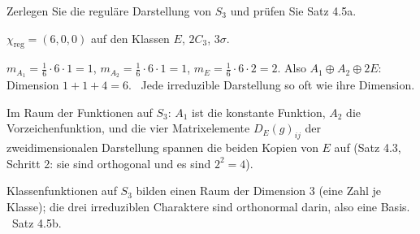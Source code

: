 \begin{aufgabe}
Zerlegen Sie die reguläre Darstellung von $S_3$ und prüfen Sie Satz 4.5a.

\loesung
{}
$\chi_{\mathrm{reg}} = (6, 0, 0)$ auf den Klassen $E$, $2C_3$, $3\sigma$.

$m_{A_1} = \frac16\cdot6\cdot1 = 1$, $m_{A_2} = \frac16\cdot6\cdot1 = 1$, $m_E = \frac16\cdot6\cdot2 = 2$. Also $A_1\oplus A_2\oplus2E$: Dimension $1 + 1 + 4 = 6$. \checkmark\ Jede irreduzible Darstellung so oft wie ihre Dimension. \checkmark

Im Raum der Funktionen auf $S_3$: $A_1$ ist die konstante Funktion, $A_2$ die Vorzeichenfunktion, und die vier Matrixelemente $D_E(g)_{ij}$ der zweidimensionalen Darstellung spannen die beiden Kopien von $E$ auf (Satz 4.3, Schritt 2: sie sind orthogonal und es sind $2^{2} = 4$).

Klassenfunktionen auf $S_3$ bilden einen Raum der Dimension $3$ (eine Zahl je Klasse); die drei irreduziblen Charaktere sind orthonormal darin, also eine Basis. \checkmark\ Satz 4.5b.

\begin{center}
\begin{minipage}{0.88\textwidth}
\end{minipage}
\end{center}
\end{aufgabe}


